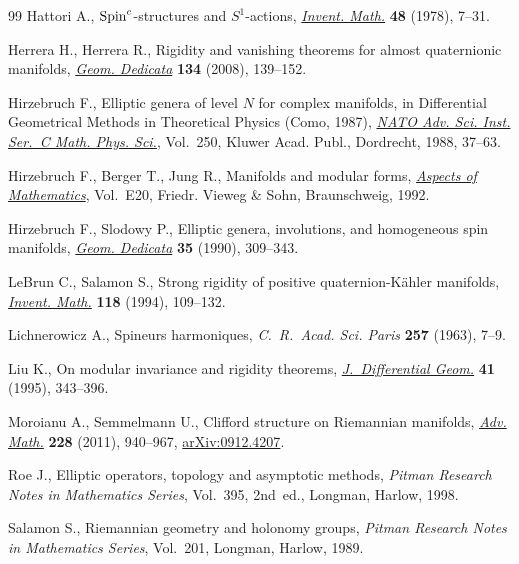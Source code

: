 \documentclass[pdftex]{sigma}
\numberwithin{equation}{section}
\begin{document}
\begin{thebibliography}{99}
Hattori A., {${\rm Spin}^{c}$}-structures and {$S^{1}$}-actions,
 \href{https://doi.org/10.1007/BF01390060}{\textit{Invent. Math.}} \textbf{48} (1978), 7--31.

Herrera H., Herrera R., Rigidity and vanishing theorems for almost quaternionic
 manifolds, \href{https://doi.org/10.1007/s10711-008-9250-4}{\textit{Geom. Dedicata}} \textbf{134} (2008), 139--152.

Hirzebruch F., Elliptic genera of level {$N$} for complex manifolds, in
 Dif\/ferential Geometrical Methods in Theoretical Physics ({C}omo, 1987),
 \href{https://doi.org/10.1007/978-94-015-7809-7_3}{\textit{NATO Adv. Sci. Inst. Ser.~C Math. Phys. Sci.}}, Vol.~250, Kluwer Acad.
 Publ., Dordrecht, 1988, 37--63.

Hirzebruch F., Berger T., Jung R., Manifolds and modular forms, \href{https://doi.org/10.1007/978-3-663-14045-0}{\textit{Aspects
 of Mathematics}}, Vol.~E20, Friedr. Vieweg \& Sohn, Braunschweig, 1992.

Hirzebruch F., Slodowy P., Elliptic genera, involutions, and homogeneous spin
 manifolds, \href{https://doi.org/10.1007/BF00147351}{\textit{Geom. Dedicata}} \textbf{35} (1990), 309--343.

LeBrun C., Salamon S., Strong rigidity of positive quaternion-{K}\"ahler
 manifolds, \href{https://doi.org/10.1007/BF01231528}{\textit{Invent. Math.}} \textbf{118} (1994), 109--132.

Lichnerowicz A., Spineurs harmoniques, \textit{C.~R.~Acad. Sci. Paris}
 \textbf{257} (1963), 7--9.

Liu K., On modular invariance and rigidity theorems, \href{https://doi.org/10.4310/jdg/1214456221}{\textit{J.~Differential
 Geom.}} \textbf{41} (1995), 343--396.

Moroianu A., Semmelmann U., Clif\/ford structure on {R}iemannian manifolds,
 \href{https://doi.org/10.1016/j.aim.2011.06.006}{\textit{Adv. Math.}} \textbf{228} (2011), 940--967, \href{http://arxiv.org/abs/0912.4207}{arXiv:0912.4207}.

Roe J., Elliptic operators, topology and asymptotic methods, \textit{Pitman
 Research Notes in Mathematics Series}, Vol.~395, 2nd~ed., Longman, Harlow,
 1998.

Salamon S., Riemannian geometry and holonomy groups, \textit{Pitman Research
 Notes in Mathematics Series}, Vol.~201, Longman, Harlow, 1989.


\end{thebibliography}
\end{document}
